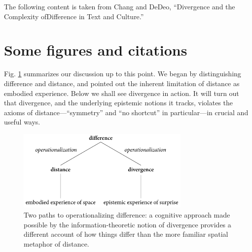 The following content is taken from Chang and DeDeo, ``Divergence and the Complexity ofDifference in Text and Culture.''

\section{Some figures and citations}

Fig. \ref{fig:operationalization_summary} summarizes our discussion up to this point. We began by distinguishing difference and distance, and pointed out the inherent limitation of distance as embodied experience. Below we shall see divergence in action. It will turn out that divergence, and the underlying epistemic notions it tracks, violates the axioms of distance---``symmetry'' and ``no shortcut'' in particular---in crucial and useful ways.

\begin{figure}[H]%
  \centering
  \includegraphics[width=0.75\textwidth]{fig/summary.pdf}
  \caption{Two paths to operationalizing difference: a cognitive approach made possible by the information-theoretic notion of divergence provides a different account of how things differ than the more familiar spatial metaphor of distance.}
  \label{fig:operationalization_summary}
\end{figure}


